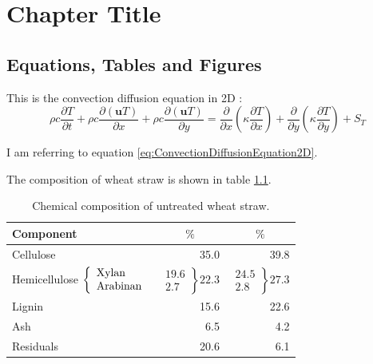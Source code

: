\chapter{Chapter Title}

\section{Equations, Tables and Figures}

This is the convection diffusion equation in 2D \citep{EgelandGravdahl2002}:
\begin{equation}
 \rho c\frac{\partial T}{\partial t}+\rho c\frac{\partial\left(\mathbf{u}T\right)}{\partial x}+\rho c\frac{\partial\left(\mathbf{u}T\right)}{\partial y}=\frac{\partial}{\partial x}\left(\kappa\frac{\partial T}{\partial x}\right)+\frac{\partial}{\partial y}\left(\kappa\frac{\partial T}{\partial y}\right)+S_T
 \label{eq:ConvectionDiffusionEquation2D}
\end{equation}

I am referring to equation \eqref{eq:ConvectionDiffusionEquation2D}.


The composition of wheat straw is shown in table \ref{tab:RawWheatStrawComposition}.
\begin{table}[htbp]
 \centering
 \begin{tabular}{l|r|r}
  Component			&\multicolumn{1}{c|}{$\%$}	&\multicolumn{1}{c}{$\%$}\\\hline\hline
  Cellulose			&35.0						&39.8\\
  Hemicellulose $\left\{
  \begin{array}{l}
   \textup{Xylan}\\
   \textup{Arabinan}
  \end{array}\right.$ 		& $\left.
				    \begin{array}{r}
				      19.6\\
				      2.7
				    \end{array}\right\}22.3$	& $\left.\begin{array}{r}24.5\\2.8\end{array}\right\}27.3$\\
  Lignin 			&15.6						&22.6\\
  Ash				&6.5						&4.2\\
  Residuals			&20.6						&6.1\\\hline
 \end{tabular}
 \caption{Chemical composition of untreated wheat straw.}
 \label{tab:RawWheatStrawComposition}
\end{table}

